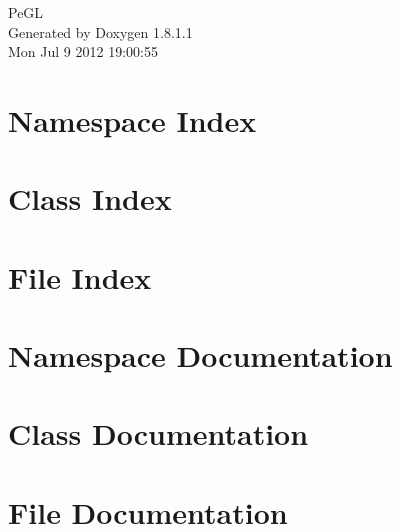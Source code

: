 \documentclass{book}
\begin{document}
\hypersetup{pageanchor=false,citecolor=blue}
\begin{titlepage}
\vspace*{7cm}
\begin{center}
{\Large Pe\-G\-L }\\
\vspace*{1cm}
{\large Generated by Doxygen 1.8.1.1}\\
\vspace*{0.5cm}
{\small Mon Jul 9 2012 19:00:55}\\
\end{center}
\end{titlepage}
\clearemptydoublepage
{}
\tableofcontents
\clearemptydoublepage
{}
\hypersetup{pageanchor=true,citecolor=blue}
\chapter{Namespace Index}

\chapter{Class Index}

\chapter{File Index}

\chapter{Namespace Documentation}

\chapter{Class Documentation}










\chapter{File Documentation}





\printindex
\end{document}
